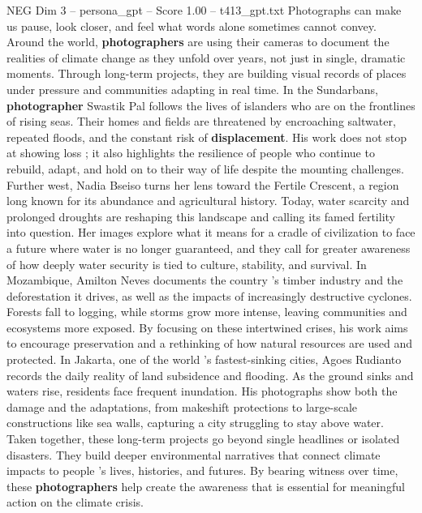 \begin{textsample}{NEG Dim 3 – persona\_gpt – Score 1.00 – t413\_gpt.txt}  \label{ex:f3_neg_036}
Photographs can make us pause, look closer, and feel what words alone sometimes cannot convey.
Around the world, \textbf{photographers} are using their cameras to document the realities of climate change as they unfold over years, not just in single, dramatic moments.
Through long-term projects, they are building visual records of places under pressure and communities adapting in real time.
In the Sundarbans, \textbf{photographer} Swastik Pal follows the lives of islanders who are on the frontlines of rising seas.
Their homes and fields are threatened by encroaching saltwater, repeated floods, and the constant risk of \textbf{displacement}.
His work does not stop at showing loss ; it also highlights the resilience of people who continue to rebuild, adapt, and hold on to their way of life despite the mounting challenges.
Further west, Nadia Bseiso turns her lens toward the Fertile Crescent, a region long known for its abundance and agricultural history.
Today, water scarcity and prolonged droughts are reshaping this landscape and calling its famed fertility into question.
Her images explore what it means for a cradle of civilization to face a future where water is no longer guaranteed, and they call for greater awareness of how deeply water security is tied to culture, stability, and survival.
In Mozambique, Amilton Neves documents the country ’s timber industry and the deforestation it drives, as well as the impacts of increasingly destructive cyclones.
Forests fall to logging, while storms grow more intense, leaving communities and ecosystems more exposed.
By focusing on these intertwined crises, his work aims to encourage preservation and a rethinking of how natural resources are used and protected.
In Jakarta, one of the world ’s fastest-sinking cities, Agoes Rudianto records the daily reality of land subsidence and flooding.
As the ground sinks and waters rise, residents face frequent inundation.
His photographs show both the damage and the adaptations, from makeshift protections to large-scale constructions like sea walls, capturing a city struggling to stay above water.
Taken together, these long-term projects go beyond single headlines or isolated disasters.
They build deeper environmental narratives that connect climate impacts to people ’s lives, histories, and futures.
By bearing witness over time, these \textbf{photographers} help create the awareness that is essential for meaningful action on the climate crisis.

\end{textsample}
